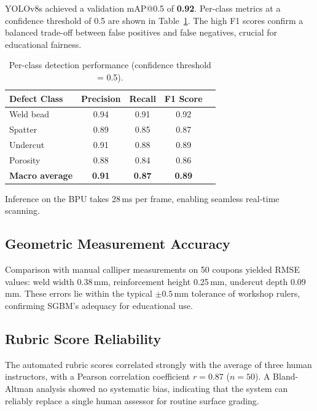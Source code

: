 \documentclass[12pt,a4paper]{article}
\begin{document}
YOLOv8s achieved a validation mAP@0.5 of \textbf{0.92}. Per-class metrics at a confidence threshold of 0.5
are shown in Table~\ref{tab:detection}. The high F1 scores confirm a balanced trade-off between false
positives and false negatives, crucial for educational fairness.

\begin{table}[htbp]
  \centering
  \caption{Per-class detection performance (confidence threshold = 0.5).}
  \label{tab:detection}
  \begin{tabular}{lcccc}
    \toprule
    \textbf{Defect Class} & \textbf{Precision} & \textbf{Recall} & \textbf{F1 Score} \\
    \midrule
    Weld bead    & 0.94 & 0.91 & 0.92 \\
    Spatter      & 0.89 & 0.85 & 0.87 \\
    Undercut     & 0.91 & 0.88 & 0.89 \\
    Porosity     & 0.88 & 0.84 & 0.86 \\
    \midrule
    \textbf{Macro average} & \textbf{0.91} & \textbf{0.87} & \textbf{0.89} \\
    \bottomrule
  \end{tabular}
\end{table}

Inference on the BPU takes 28\,ms per frame, enabling seamless real-time scanning.

\subsection{Geometric Measurement Accuracy}

Comparison with manual calliper measurements on 50 coupons yielded RMSE values: weld width 0.38\,mm,
reinforcement height 0.25\,mm, undercut depth 0.09\,mm. These errors lie within the typical $\pm0.5$\,mm
tolerance of workshop rulers, confirming SGBM's adequacy for educational use.

\subsection{Rubric Score Reliability}

The automated rubric scores correlated strongly with the average of three human instructors, with a Pearson
correlation coefficient $r = 0.87$ ($n = 50$). A Bland-Altman analysis showed no systematic bias, indicating
that the system can reliably replace a single human assessor for routine surface grading.
\end{document}
